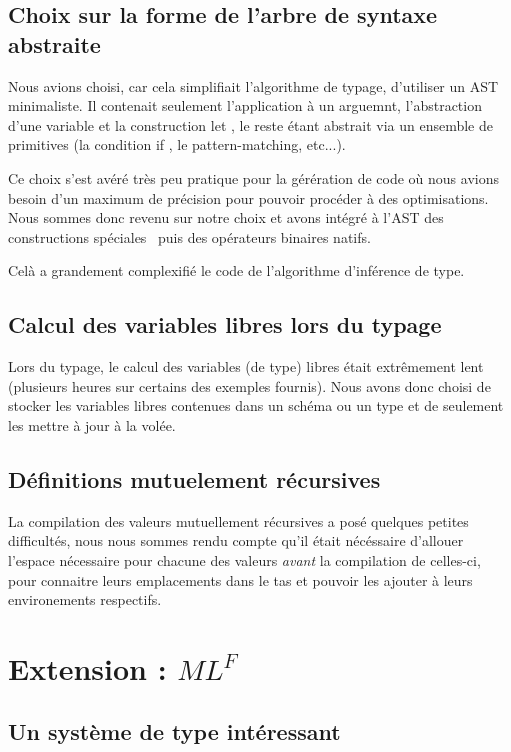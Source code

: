 \documentclass[a4paper]{article}
\def\mlf{$ML^F$}
\begin{document}
\subsection{Choix sur la forme de l'arbre de syntaxe abstraite}
Nous avions choisi, car cela simplifiait l'algorithme de typage,
d'utiliser un AST minimaliste. Il contenait seulement l'application à
un arguemnt, l'abstraction d'une variable et la construction \og let
\fg, le reste étant abstrait via un ensemble de primitives (la
condition \og if \fg, le pattern-matching, etc...).

Ce choix s'est avéré très peu pratique pour la gérération de code où
nous avions besoin d'un maximum de précision pour pouvoir procéder à
des optimisations. Nous sommes donc revenu sur notre choix et avons
intégré à l'AST des \og constructions spéciales \fg~puis des opérateurs
binaires natifs.

Celà a grandement complexifié le code de l'algorithme d'inférence de type.

\subsection{Calcul des variables libres lors du typage}

Lors du typage, le calcul des variables (de type) libres était
extrêmement lent (plusieurs heures sur certains des exemples fournis).
Nous avons donc choisi de stocker les variables libres contenues dans
un schéma ou un type et de seulement les mettre à jour à la volée.


\subsection{Définitions mutuelement récursives}

La compilation des valeurs mutuellement récursives a posé quelques
petites difficultés, nous nous sommes rendu compte qu'il était
nécéssaire d'allouer l'espace nécessaire pour chacune des valeurs
\emph{avant} la compilation de celles-ci, pour connaitre leurs
emplacements dans le tas et pouvoir les ajouter à leurs environements
respectifs.

\section{Extension : \mlf}\label{mlf}

\subsection{Un système de type intéressant}
\end{document}
